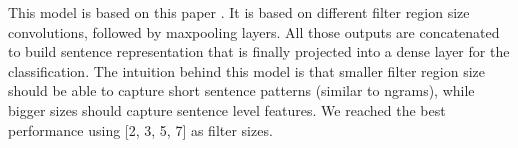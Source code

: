 This model is based on this paper \cite{kim2014convolutional}. It is based on different filter region size convolutions, followed by maxpooling layers.
All those outputs are concatenated to build sentence representation that is finally projected into a dense layer for the classification.
The intuition behind this model is that smaller filter region size should be able to capture short sentence patterns (similar to ngrams), while bigger sizes should capture sentence level features. We reached the best performance using [2, 3, 5, 7] as filter sizes.

